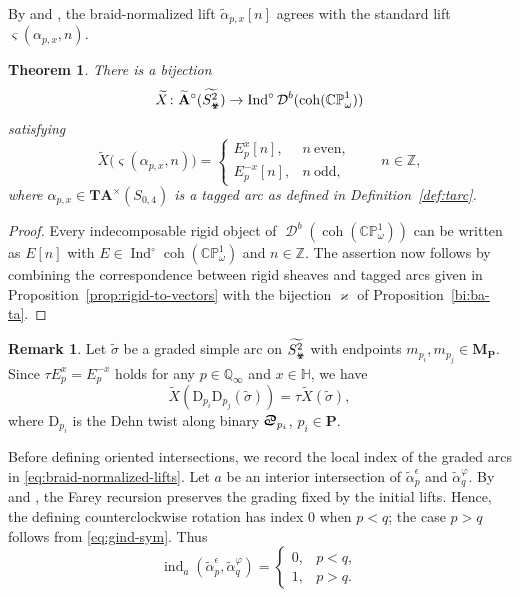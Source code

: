 \documentclass[11pt,a4paper,reqno]{amsart}%
\theoremstyle{plain}
\newtheorem{theorem}{Theorem}[section]
\theoremstyle{definition}
\newtheorem{remark}[remark]{Remark}
\numberwithin{equation}{section}
\numberwithin{equation}{section}
\newcommand{\QQi}{\mathbb{Q}_\infty}
\newcommand{\Ind}{\operatorname{Ind}\nolimits}
\newcommand{\D}{\operatorname{\mathcal{D}}}
\newcommand{\gind}{\operatorname{ind}\nolimits}
\def\wt{\omega}
\def\x{_\vot}
\def\coh{\operatorname{coh}}
\def\Ind{\operatorname{Ind}}
\def\M{\mathbf{M}}
\def\A{\mathbf{A}}
\def\coh{\operatorname{coh}}
\def\CPone{\mathbb{CP}^1_{\wt}}
\newcommand\DC[1]{\D^b(\coh(#1))}
\def\TA{\mathbf{T}\mathbf{A}}
\def\wA{\widetilde{\A}}
\def\wX{\widetilde{X}}
\renewcommand\P{\mathbf{P}} %
\newcommand{\bfH}{\mathbb{H}}
\def\vot{\text{\Biohazard}}
\def\sx{\text{\Cancer}}
\begin{document}
By  and , the braid-normalized lift $\widetilde{\alpha}_{p,x}[n]$ agrees with the standard lift $\varsigma(\alpha_{p,x},n)$.
\begin{theorem}\label{thm:X} There is a bijection
$$\wX\colon \wA^\circ(\widetilde{S\x^2} ) \to \Ind^\circ\DC{\CPone}$$
satisfying
 \[
\widetilde{X}\bigl(\varsigma(\alpha_{p,x},n)\bigr)=
\begin{cases}
E_p^x[n],   & n\ \text{even},\\[4pt]
E_p^{-x}[n], & n\ \text{odd},
\end{cases}
\qquad n\in\mathbb{Z},
\]
where $\alpha_{p,x} \in  \TA^\times(S_{0,4})$ is a tagged arc as defined in Definition~\ref{def:tarc}. 
\end{theorem}
 \begin{proof}
Every indecomposable rigid object of $\DC{\CPone}$ can be written as $E[n]$ with $E\in\Ind^\circ\coh(\CPone)$ and $n\in\mathbb{Z}$. 
The assertion now follows by combining the correspondence between rigid sheaves and tagged arcs given in Proposition~\ref{prop:rigid-to-vectors} with the bijection $\varkappa$ of Proposition~\ref{bi:ba-ta}.
 \end{proof}
 

\begin{remark} 
Let $\widetilde{\sigma}$ be a graded simple arc on $\widetilde{S\x^2} $ with 
endpoints  $m_{p_i},m_{p_j}\in \M_\P.$
Since $\tau {E}_p^x={E}_p^{-x}$ holds for any   $p\in\QQi$ and $x\in\bfH$, we have $$\wX(\mathrm{D}_{ {p_i}}\mathrm{D}_{ {p_j}}(\widetilde{\sigma}))=\tau\wX(\widetilde{\sigma}),$$
where $\mathrm{D}_{p_i}$ is  the Dehn twist along binary    $\sx_{p_i}$, $p_i\in\P$.
\end{remark}

Before defining oriented intersections, we record the local index of the graded arcs in \eqref{eq:braid-normalized-lifts}. Let $a$ be an interior intersection of $\widetilde{\alpha}_p^\epsilon$ and $\widetilde{\alpha}_q^\varphi$. By  and , the Farey recursion preserves the grading fixed by the initial lifts. Hence, the defining counterclockwise rotation has index $0$ when $p<q$; the case $p>q$ follows from \eqref{eq:gind-sym}. Thus
\[
\gind_a(\widetilde{\alpha}_p^\epsilon,\widetilde{\alpha}_q^\varphi)=
\begin{cases}
0,&p<q,\\
1,&p>q.
\end{cases}
\]
\end{document}
